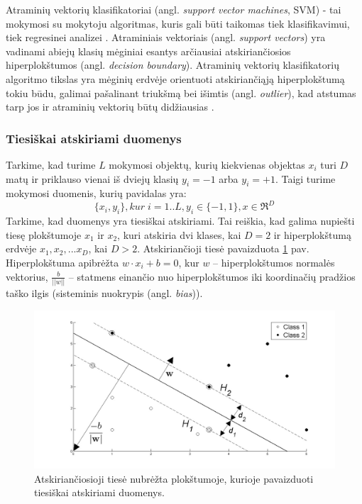 Atraminių vektorių klasifikatoriai (angl. \textit{support vector machines}, SVM) - tai mokymosi su mokytoju algoritmas, kuris gali būti taikomas tiek klasifikavimui, tiek regresinei analizei \cite{vapnik2000nature}. Atraminiais vektoriais (angl. \textit{support vectors}) yra vadinami abiejų klasių mėginiai esantys arčiausiai atskiriančiosios hiperplokštumos (angl. \textit{decision boundary}). Atraminių vektorių klasifikatorių algoritmo tikslas yra mėginių erdvėje orientuoti atskiriančiąją hiperplokštumą tokiu būdu, galimai pašalinant triukšmą bei išimtis (angl. \textit{outlier}), kad atstumas tarp jos ir atraminių vektorių būtų didžiausias \cite{cortes1995support}. 

\subsubsection{Tiesiškai atskiriami duomenys}

Tarkime, kad turime $L$ mokymosi objektų, kurių kiekvienas objektas $x_i$ turi $D$ matų ir priklauso vienai iš dviejų klasių $y_i=-1$ arba $y_i=+1$. Taigi turime mokymosi duomenis, kurių pavidalas yra:
\begin{equation}
 \{x_i, y_i\}, kur\; i=1..L, y_i \in \{-1,1\}, x \in \Re^D
\end{equation}
Tarkime, kad duomenys yra tiesiškai atskiriami. Tai reiškia, kad galima nupiešti tiesę plokštumoje $x_1$ ir $x_2$, kuri atskiria dvi klases, kai $D=2$ ir hiperplokštumą erdvėje $x_1, x_2,...x_D$, kai $D > 2$. Atskiriančioji tiesė pavaizduota \ref{fig:support_vector_machines} pav. Hiperplokštuma apibrėžta $w\cdot x_i + b = 0$, kur $w$ -- hiperplokštumos normalės vektorius, $\frac{b}{||w||}$ -- statmens einančio nuo hiperplokštumos iki koordinačių pradžios taško ilgis (sisteminis nuokrypis (angl. \textit{bias})).
\begin{figure}
 \centering
 \includegraphics[width=.7\textwidth]{images/support_vector_machines.jpg}
 \caption{Atskiriančiosioji tiesė nubrėžta plokštumoje, kurioje pavaizduoti tiesiškai atskiriami duomenys.}
 \label{fig:support_vector_machines}
\end{figure}

